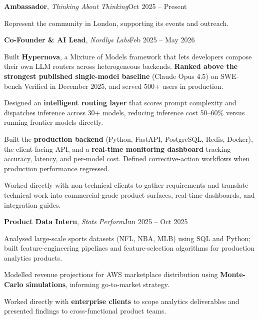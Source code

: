 \documentclass[a4paper,10pt]{article}
\newcommand{\job}[3]{%
  \noindent\textbf{#1}, \textit{#2}\hfill {\color{black!70}#3}\par\vspace{1.5pt}%
}
\newenvironment{tight}{%
  \begin{list}{\textbullet}{%
    \setlength{\leftmargin}{1.35em}\setlength{\labelsep}{0.5em}%
    \setlength{\itemsep}{1.0pt}\setlength{\parsep}{0pt}\setlength{\topsep}{2.5pt}%
    \setlength{\partopsep}{0pt}}%
}{\end{list}}
\begin{document}
\job{Ambassador}{Thinking About Thinking}{Oct 2025 – Present}
\begin{tight}
  \item Represent the community in London, supporting its events and outreach.
\end{tight}
\vspace{4pt}

\job{Co-Founder \& AI Lead}{Nordlys Labs}{Feb 2025 – May 2026}
\begin{tight}
  \item Built \textbf{Hypernova}, a Mixture of Models framework that lets developers compose their own LLM routers across heterogeneous backends. \textbf{Ranked above the strongest published single-model baseline} (Claude Opus 4.5) on SWE-bench Verified in December 2025, and served 500+ users in production.
  \item Designed an \textbf{intelligent routing layer} that scores prompt complexity and dispatches inference across 30+ models, reducing inference cost 50–60\% versus running frontier models directly.
  \item Built the \textbf{production backend} (Python, FastAPI, PostgreSQL, Redis, Docker), the client-facing API, and a \textbf{real-time monitoring dashboard} tracking accuracy, latency, and per-model cost. Defined corrective-action workflows when production performance regressed.
  \item Worked directly with non-technical clients to gather requirements and translate technical work into commercial-grade product surfaces, real-time dashboards, and integration guides.
\end{tight}
\vspace{4pt}

\job{Product Data Intern}{Stats Perform}{Jun 2025 – Oct 2025}
\begin{tight}
  \item Analysed large-scale sports datasets (NFL, NBA, MLB) using SQL and Python; built feature-engineering pipelines and feature-selection algorithms for production analytics products.
  \item Modelled revenue projections for AWS marketplace distribution using \textbf{Monte-Carlo simulations}, informing go-to-market strategy.
  \item Worked directly with \textbf{enterprise clients} to scope analytics deliverables and presented findings to cross-functional product teams.
\end{tight}
\vspace{4pt}
\end{document}
